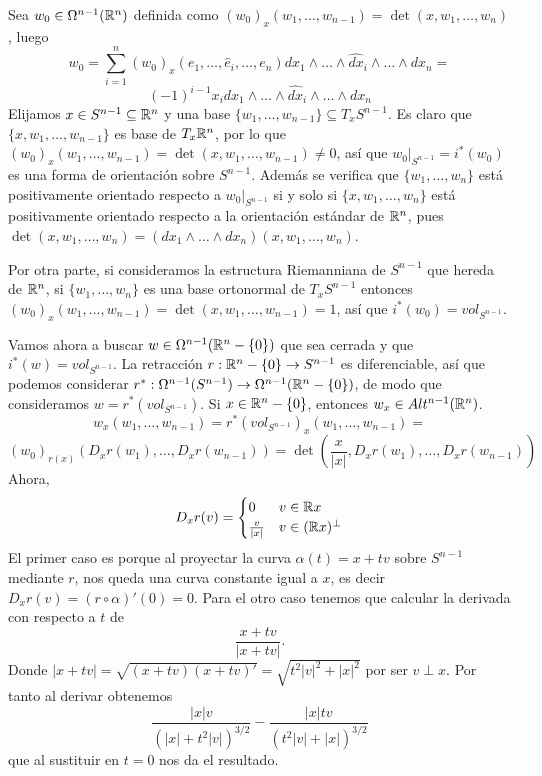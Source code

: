 \documentclass[CV.tex]{subfiles}
\begin{document}
\begin{ej}\label{9.18}
Sea $w_0\in\Omega^{n-1}(\mathbb{R}^n)$ definida como $(w_0)_x(w_1,\dots, w_{n-1})=\det(x,w_1,\dots, w_n)$, luego
\[
w_0=\sum_{i=1}^n (w_0)_x(e_1,\dots, \hat{e}_i, \dots, e_n) dx_1\land\dots\land \hat{dx}_i\land\dots\land dx_n=
\]
\[
(-1)^{i-1}x_i dx_1\land\dots\land \hat{dx}_i\land\dots\land dx_n
\]
Elijamos $x\in S^{n-1}\subseteq\mathbb{R}^n$ y una base $\{w_1,\dots, w_{n-1}\}\subseteq T_x S^{n-1}$.  Es claro que $\{x, w_1,\dots, w_{n-1}\}$ es base de $T_x\mathbb{R}^n$, por lo que $(w_0)_x(w_1,\dots, w_{n-1})=\det(x,w_1,\dots, w_{n-1})\neq 0$, así que $w_0|_{S^{n-1}}=i^*(w_0)$ es una forma de orientación sobre $S^{n-1}$. Además se verifica que $\{w_1,\dots, w_n\}$ está positivamente orientado respecto a $w_0|_{S^{n-1}}$ si y solo si $\{x,w_1,\dots, w_n\}$ está positivamente orientado respecto a la orientación estándar de $\mathbb{R}^n$, pues $\det(x,w_1,\dots, w_n)=(dx_1\land\dots\land dx_n)(x, w_1,\dots, w_n)$. 

Por otra parte, si consideramos la estructura Riemanniana de $S^{n-1}$ que hereda de $\mathbb{R}^n$, si $\{w_1,\dots, w_n\}$ es una base ortonormal de $T_xS^{n-1}$ entonces $(w_0)_x(w_1,\dots, w_{n-1})=\det(x,w_1,\dots, w_{n-1})=1$, así que $i^*(w_0)=vol_{S^{n-1}}$.

Vamos ahora a buscar $w\in\Omega^{n-1}(\mathbb{R}^n-\{0\})$ que sea cerrada y que $i^*(w)=vol_{S^{n-1}}$. La retracción $r:\mathbb{R}^n-\{0\}\to S^{n-1}$ es diferenciable, así que podemos considerar $r^*:\Omega^{n-1}(S^{n-1})\to \Omega^{n-1}(\mathbb{R}^n-\{0\})$, de modo que consideramos $w=r^*(vol_{S^{n-1}})$. Si $x\in\mathbb{R}^n-\{0\}$, entonces $w_x\in Alt^{n-1}(\mathbb{R}^n)$.
\[
w_x(w_1,\dots, w_{n-1})=r^*(vol_{S^{n-1}})_x(w_1,\dots, w_{n-1})=
\]
\[
(w_0)_{r(x)}(D_x r(w_1),\dots, D_x r(w_{n-1}))=\det\left(\frac{x}{|x|}, D_x r(w_1),\dots, D_x r(w_{n-1})\right)
\]
Ahora, 
\[
D_xr(v)=\begin{cases}
0 & v\in\mathbb{R} x\\
\frac{v}{|x|} & v\in(\mathbb{R} x)^{\perp}
\end{cases}
\]
El primer caso es porque al proyectar la curva $\alpha(t)=x+tv$ sobre $S^{n-1}$ mediante $r$, nos queda una curva constante igual a $x$, es decir $D_xr(v)=(r\circ \alpha)'(0)=0$. Para el otro caso tenemos que calcular la derivada con respecto a $t$ de 
\[
\frac{x+tv}{|x+tv|}.
\]
Donde $|x+tv|=\sqrt{(x+tv)(x+tv)'}=\sqrt{t^2|v|^2+|x|^2}$ por ser $v\perp x$. Por tanto al derivar obtenemos
\[
\frac{|x| v}{(|x| + t^2 |v|)^{3/2}}-\frac{|x|tv}{(t^2|v|+|x|)^{3/2}}
\]
que al sustituir en $t=0$ nos da el resultado.


\end{ej}
\end{document}
